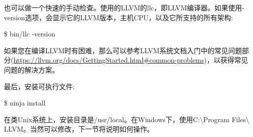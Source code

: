 也可以做一个快速的手动检查。使用的LLVM的llc，即LLVM编译器。如果使用-version选项，会显示它的LLVM版本，主机CPU，以及它所支持的所有架构:\par

\begin{tcolorbox}[colback=white,colframe=black]
\$ bin/llc -version
\end{tcolorbox}

如果您在编译LLVM时有困难，那么可以参考LLVM系统文档入门中的常见问题部分(\url{https://llvm.org/docs/GettingStarted.html\#common-problems})，以获得常见问题的解决方案。\par

最后，安装可执行文件:\par

\begin{tcolorbox}[colback=white,colframe=black]
\$ ninja install
\end{tcolorbox}

在类Unix系统上，安装目录是/usr/local。在Windows下，使用C:$\setminus$Program Files$\setminus$LLVM。当然可以修改，下一节将说明如何操作。\par






